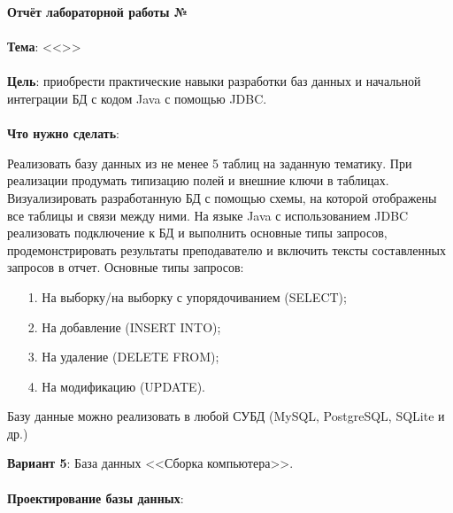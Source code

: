 \documentclass[12pt, a4paper, simple]{eskdtext}
\def \gpiDocTopic {Отчёт лабораторной работы №\gpiDocNum}
\begin{document}
    
    \begin{center}
        \textbf{\gpiDocTopic}
    \end{center}

    \paragraph{} \textbf{Тема}: <<\gpiTopicRep>>

    \paragraph{} \textbf{Цель}:
    приобрести практические навыки разработки баз данных и начальной интеграции БД с кодом Java с помощью JDBC.

    \paragraph{} \textbf{Что нужно сделать}:

    Реализовать базу данных из не менее 5 таблиц на заданную тематику.
    При реализации продумать типизацию полей и внешние ключи в таблицах.
    Визуализировать разработанную БД с помощью схемы, на которой отображены все таблицы и связи между ними.
    На языке Java с использованием JDBC реализовать подключение к БД и выполнить основные типы запросов,
    продемонстрировать результаты преподавателю и включить тексты составленных запросов в отчет.
    Основные типы запросов:
    \begin{enumerate}
        \item[1.] На выборку/на выборку с упорядочиванием (SELECT);
        \item[2.] На добавление (INSERT INTO);
        \item[3.] На удаление (DELETE FROM);
        \item[4.] На модификацию (UPDATE).
    \end{enumerate}
    
    Базу данные можно реализовать в любой СУБД (MySQL, PostgreSQL, SQLite и др.)

    \textbf{Вариант 5}: База данных <<Сборка компьютера>>.

    \paragraph{} \textbf{Проектирование базы данных}:
\end{document}
